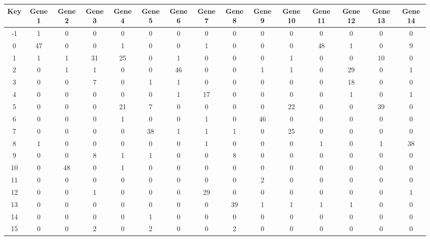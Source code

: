 \begin{tabular}{|c|c|c|c|c|c|c|c|c|c|c|c|c|c|c|}
\hline
Key & Gene 1 & Gene 2 & Gene 3 & Gene 4 & Gene 5 & Gene 6 & Gene 7 & Gene 8 & Gene 9 & Gene 10 & Gene 11 & Gene 12 & Gene 13 & Gene 14 \\
\hline
-1 & 1 & 0 & 0 & 0 & 0 & 0 & 0 & 0 & 0 & 0 & 0 & 0 & 0 & 0 \\
0 & 47 & 0 & 0 & 1 & 0 & 0 & 1 & 0 & 0 & 0 & 48 & 1 & 0 & 9 \\
1 & 1 & 1 & 31 & 25 & 0 & 1 & 0 & 0 & 0 & 1 & 0 & 0 & 10 & 0 \\
2 & 0 & 1 & 1 & 0 & 0 & 46 & 0 & 0 & 1 & 1 & 0 & 29 & 0 & 1 \\
3 & 0 & 0 & 7 & 0 & 1 & 1 & 0 & 0 & 0 & 0 & 0 & 18 & 0 & 0 \\
4 & 0 & 0 & 0 & 0 & 0 & 1 & 17 & 0 & 0 & 0 & 0 & 1 & 0 & 1 \\
5 & 0 & 0 & 0 & 21 & 7 & 0 & 0 & 0 & 0 & 22 & 0 & 0 & 39 & 0 \\
6 & 0 & 0 & 0 & 1 & 0 & 0 & 1 & 0 & 46 & 0 & 0 & 0 & 0 & 0 \\
7 & 0 & 0 & 0 & 0 & 38 & 1 & 1 & 1 & 0 & 25 & 0 & 0 & 0 & 0 \\
8 & 1 & 0 & 0 & 0 & 0 & 0 & 1 & 0 & 0 & 0 & 1 & 0 & 1 & 38 \\
9 & 0 & 0 & 8 & 1 & 1 & 0 & 0 & 8 & 0 & 0 & 0 & 0 & 0 & 0 \\
10 & 0 & 48 & 0 & 1 & 0 & 0 & 0 & 0 & 0 & 0 & 0 & 0 & 0 & 0 \\
11 & 0 & 0 & 0 & 0 & 0 & 0 & 0 & 0 & 2 & 0 & 0 & 0 & 0 & 0 \\
12 & 0 & 0 & 1 & 0 & 0 & 0 & 29 & 0 & 0 & 0 & 0 & 0 & 0 & 1 \\
13 & 0 & 0 & 0 & 0 & 0 & 0 & 0 & 39 & 1 & 1 & 1 & 1 & 0 & 0 \\
14 & 0 & 0 & 0 & 0 & 1 & 0 & 0 & 0 & 0 & 0 & 0 & 0 & 0 & 0 \\
15 & 0 & 0 & 2 & 0 & 2 & 0 & 0 & 2 & 0 & 0 & 0 & 0 & 0 & 0 \\
\hline
\end{tabular}